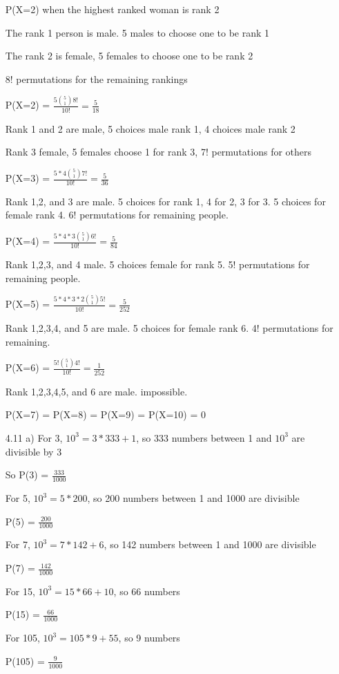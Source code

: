 \documentclass[11pt]{article}
\begin{document}
\begin{itemize}
  P(X=2) when the highest ranked woman is rank 2

  The rank 1 person is male. 5 males to choose one to be rank 1

  The rank 2 is female, 5 females to choose one to be rank 2

  8! permutations for the remaining rankings

  P(X=2) = $\frac{5\binom{5}{1} 8!}{10!} = \frac{5}{18}$

  Rank 1 and 2 are male, 5 choices male rank 1, 4 choices male rank 2

  Rank 3 female, 5 females choose 1 for rank 3, 7! permutations for others

  P(X=3) = $\frac{5*4\binom{5}{1} 7!}{10!} = \frac{5}{36}$

  Rank 1,2, and 3 are male. 5 choices for rank 1, 4 for 2, 3 for 3. 5 choices for female rank 4. 6! permutations for remaining people.

  P(X=4) = $\frac{5*4*3\binom{5}{1} 6!}{10!} = \frac{5}{84}$

  Rank 1,2,3, and 4 male. 5 choices female for rank 5. 5! permutations for remaining people.

  P(X=5) = $\frac{5*4*3*2\binom{5}{1}5!}{10!} = \frac{5}{252}$

  Rank 1,2,3,4, and 5 are male. 5 choices for female rank 6. 4! permutations for remaining.

  P(X=6) = $\frac{5!\binom{5}{1}4!}{10!} = \frac{1}{252}$

  Rank 1,2,3,4,5, and 6 are male. impossible.

  P(X=7) = P(X=8) = P(X=9) = P(X=10) = 0
\item[4.11]
  a)
  For 3, $10^3 = 3*333 + 1$, so 333 numbers between 1 and $10^3$ are divisible by 3

  So P(3) = $\frac{333}{1000}$

  For 5, $10^3 = 5*200$, so 200 numbers between 1 and 1000 are divisible

  P(5) = $\frac{200}{1000}$

  For 7, $10^3 = 7*142 + 6$, so 142 numbers between 1 and 1000 are divisible

  P(7) = $\frac{142}{1000}$

  For 15, $10^3 = 15*66 + 10$, so 66 numbers

  P(15) = $\frac{66}{1000}$

  For 105, $10^3 = 105*9 + 55$, so 9 numbers

  P(105) = $\frac{9}{1000}$


\end{itemize}
\end{document}

